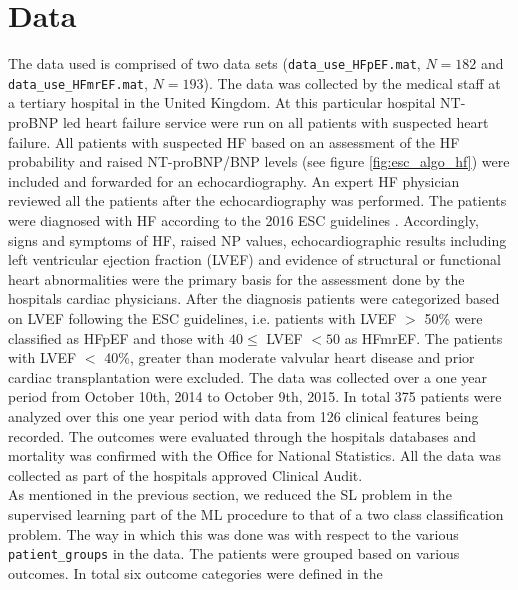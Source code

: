\documentclass[../thesis.tex]{subfiles}
\begin{document}
\section{Data}
\label{sec:data}

\noindent The data used is comprised of two data sets (\texttt{data\_use\_HFpEF.mat}, $N = 182$ and \texttt{data\_use\_HFmrEF.mat}, $N = 193$). The data was collected by the medical staff at a tertiary hospital in the United Kingdom. At this particular hospital NT-proBNP led heart failure service were run on all patients with suspected heart failure. All patients with suspected HF based on an assessment of the HF probability and raised NT-proBNP/BNP levels (see figure \ref{fig:esc_algo_hf}) were included and forwarded for an echocardiography. An expert HF physician reviewed all the patients after the echocardiography was performed. The patients were diagnosed with HF according to the 2016 ESC guidelines \citep{ponikowski2016}. Accordingly, signs and symptoms of HF, raised NP values, echocardiographic results including left ventricular ejection fraction (LVEF) and evidence of structural or functional heart abnormalities were the primary basis for the assessment done by the hospitals cardiac physicians. After the diagnosis patients were categorized based on LVEF following the ESC guidelines, i.e. patients with LVEF $>$ 50\% were classified as HFpEF and those with $40 \leq$ LVEF $< 50$ as HFmrEF. The patients with LVEF $<$ 40\%, greater than moderate valvular heart disease and prior cardiac transplantation were excluded. The data was collected over a one year period from October 10th, 2014 to October 9th, 2015. In total 375 patients were analyzed over this one year period with data from 126 clinical features being recorded. The outcomes were evaluated through the hospitals databases and mortality was confirmed with the Office for National Statistics. All the data was collected as part of the hospitals approved Clinical Audit.\\
\indent As mentioned in the previous section, we reduced the SL problem in the supervised learning part of the ML procedure to that of a two class classification problem. The way in which this was done was with respect to the various \texttt{patient\_groups} in the data. The patients were grouped based on various outcomes. In total six outcome categories were defined in the 


\end{document}

